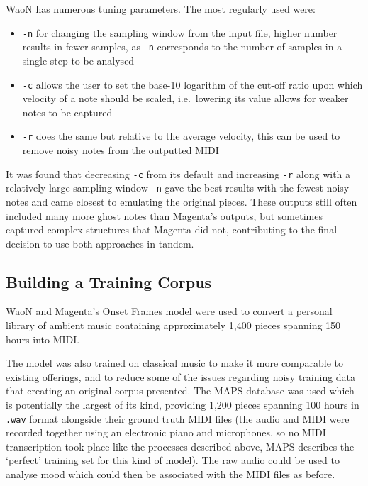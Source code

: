 \documentclass[12pt,]{article}
\providecommand{\tightlist}{%
  \setlength{\itemsep}{0pt}\setlength{\parskip}{0pt}}
\begin{document}
WaoN has numerous tuning parameters. The most regularly used were:

\begin{itemize}
\tightlist
\item
  \texttt{-n} for changing the sampling window from the input file,
  higher number results in fewer samples, as \texttt{-n} corresponds to
  the number of samples in a single step to be analysed
\item
  \texttt{-c} allows the user to set the base-10 logarithm of the
  cut-off ratio upon which velocity of a note should be scaled,
  i.e.~lowering its value allows for weaker notes to be captured
\item
  \texttt{-r} does the same but relative to the average velocity, this
  can be used to remove noisy notes from the outputted MIDI
\end{itemize}

It was found that decreasing \texttt{-c} from its default and increasing
\texttt{-r} along with a relatively large sampling window \texttt{-n}
gave the best results with the fewest noisy notes and came closest to
emulating the original pieces. These outputs still often included many
more ghost notes than Magenta's outputs, but sometimes captured complex
structures that Magenta did not, contributing to the final decision to
use both approaches in tandem.

\hypertarget{building-a-training-corpus}{%
\subsection{Building a Training
Corpus}\label{building-a-training-corpus}}

WaoN and Magenta's Onset Frames model were used to convert a personal
library of ambient music containing approximately 1,400 pieces spanning
150 hours into MIDI.

The model was also trained on classical music to make it more comparable
to existing offerings, and to reduce some of the issues regarding noisy
training data that creating an original corpus presented. The MAPS
database was used which is potentially the largest of its kind,
providing 1,200 pieces spanning 100 hours in \texttt{.wav} format
alongside their ground truth MIDI files (the audio and MIDI were
recorded together using an electronic piano and microphones, so no MIDI
transcription took place like the processes described above, MAPS
describes the `perfect' training set for this kind of model). The raw
audio could be used to analyse mood which could then be associated with
the MIDI files as before.
\end{document}
